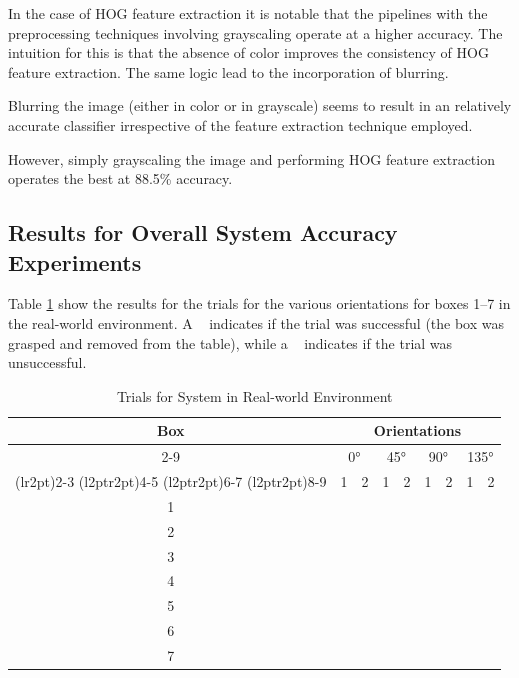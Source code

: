 \documentclass[letterpaper, 10 pt, conference]{conf/ieeeconf}  %
\newcommand{\cmark}{\ding{51}}%
\newcommand{\xmark}{\ding{55}}%
\begin{document}
In the case of HOG feature extraction it is notable that the pipelines with the
preprocessing techniques involving grayscaling operate at a higher accuracy. The
intuition for this is that the absence of color improves the consistency of HOG
feature extraction. The same logic lead to the incorporation of blurring.

Blurring the image (either in color or in grayscale) seems to result in an
relatively accurate classifier irrespective of the feature extraction technique
employed.

However, simply grayscaling the image and performing HOG feature
extraction operates the best at 88.5\% accuracy.

\subsection{Results for Overall System Accuracy Experiments}

Table \ref{tab:trials_real_world} show the results for the trials for the
various orientations for boxes 1--7 in the real-world environment. A \cmark~
indicates if the trial was successful (the box was grasped and removed from the
table), while a \xmark~ indicates if the trial was unsuccessful.
\begin{table}[H]
  \centering
  \begin{tabular}{c c c c c c c c c}
    \toprule
    \multirow{4}{*}[-0.5\dimexpr \aboverulesep + \belowrulesep + \cmidrulewidth]{Box} & \multicolumn{8}{c}{Orientations}\\
    \cmidrule(rl){2-9}
                                                                                      & \multicolumn{2}{c}{\ang{0}} & \multicolumn{2}{c}{\ang{45}} & \multicolumn{2}{c}{\ang{90}} & \multicolumn{2}{c}{\ang{135}} \\
    \cmidrule(lr{2pt}){2-3}
    \cmidrule(l{2pt}r{2pt}){4-5}
    \cmidrule(l{2pt}r{2pt}){6-7}
    \cmidrule(l{2pt}r{2pt}){8-9}
                                                                                      & 1      & 2      & 1      & 2      &  1     & 2      &  1     &  2     \\
    \midrule
    1 & \cmark & \cmark & \cmark & \cmark & \cmark & \cmark & \cmark & \cmark \\
    2 & \cmark & \cmark & \cmark & \cmark & \cmark & \cmark & \cmark & \cmark \\
    3 & \cmark & \cmark & \cmark & \cmark & \cmark & \cmark & \cmark & \cmark \\
    4 & \cmark & \cmark & \cmark & \cmark & \cmark & \cmark & \cmark & \cmark \\
    5 & \cmark & \cmark & \cmark & \cmark & \cmark & \cmark & \cmark & \cmark \\
    6 & \cmark & \cmark & \cmark & \cmark & \cmark & \cmark & \cmark & \cmark \\
    7 & \cmark & \cmark & \cmark & \cmark & \cmark & \cmark & \cmark & \cmark \\
    \bottomrule
  \end{tabular}
  \caption{Trials for System in Real-world Environment}
  \label{tab:trials_real_world}
\end{table}
\end{document}
